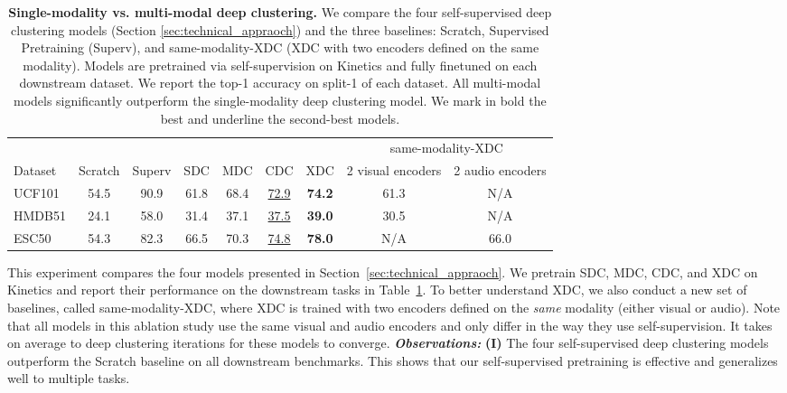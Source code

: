 \documentclass{article}
\begin{document}
\begin{table}[t!]
    \small
    \centering
    \caption{\textbf{Single-modality vs. multi-modal deep clustering.} We compare the four self-supervised deep clustering models (Section \ref{sec:technical_appraoch}) and the three baselines: Scratch, Supervised Pretraining (Superv), and same-modality-XDC (XDC with two encoders defined on the same modality). Models are pretrained via self-supervision on Kinetics and fully finetuned on each downstream dataset. We report the top-1 accuracy on split-1 of each dataset. All multi-modal models significantly outperform the single-modality deep clustering model. We mark in bold the best and underline the second-best models.}
    \begin{tabular}{l | c c | c c c c | c c }
        \hline
                &         &        &     &      &                  &           & \multicolumn{2}{c}{same-modality-XDC} \\
        Dataset & Scratch & Superv & SDC & MDC  & CDC              & XDC       & 2 visual encoders & 2 audio encoders \\
        \hline 
        UCF101 & 54.5    & 90.9   & 61.8 & 68.4 & \underline{72.9} & \bf{74.2} & 61.3 & N/A  \\
        HMDB51 & 24.1    & 58.0   & 31.4 & 37.1 & \underline{37.5} & \bf{39.0} & 30.5 & N/A \\
        ESC50  & 54.3    & 82.3   & 66.5 & 70.3 & \underline{74.8} & \bf{78.0} & N/A  & 66.0  \\
        \hline 
    \end{tabular}
    \vspace{-8pt}
    \label{table:ablation_study_dc_models}
\end{table}
This experiment compares the four models presented in Section~\ref{sec:technical_appraoch}. We pretrain SDC, MDC, CDC, and XDC on Kinetics and report their performance on the downstream tasks in Table~\ref{table:ablation_study_dc_models}. 
To better understand XDC, we also conduct a new set of baselines, called same-modality-XDC, where XDC is trained with two encoders defined on the \textit{same} modality (either visual or audio).
Note that all models in this ablation study use the same visual and audio encoders and only differ in the way they use self-supervision. It takes on average  to  deep clustering iterations for these models to converge. 
\textbf{\textit{Observations:}}
\textbf{{(I)}} The four self-supervised deep clustering models outperform the Scratch baseline on all downstream benchmarks. This shows that our self-supervised pretraining is effective and generalizes well to multiple tasks.
\end{document}
